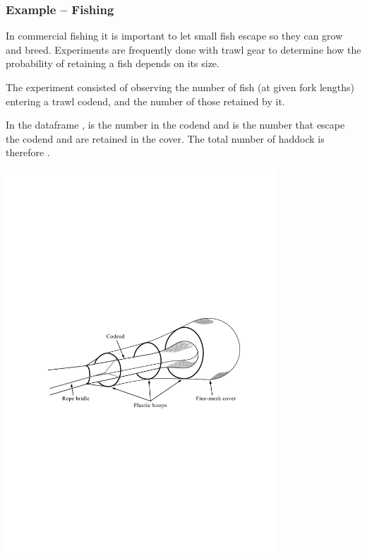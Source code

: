 \documentclass{beamer}\usepackage[]{graphicx}\usepackage[]{xcolor}
\begin{document}
\begin{frame}
\frametitle{Example -- Fishing}
In commercial fishing it is important to let small fish escape so they can grow and breed. Experiments are frequently done with trawl gear to determine how the probability of retaining a fish depends on its size.
\bigskip

The experiment consisted of
observing the number of fish (at given fork lengths) entering a trawl codend, 
and the number of those retained by it.
\medskip

In the dataframe , 
 is the number in the codend and
 is the number that escape the codend and are retained in the cover.
The total number of haddock is therefore .

\begin{center}
\includegraphics[width=4in]{Figures/CoveredCodendFig.pdf}
\end{center}
\end{frame}
\end{document}
